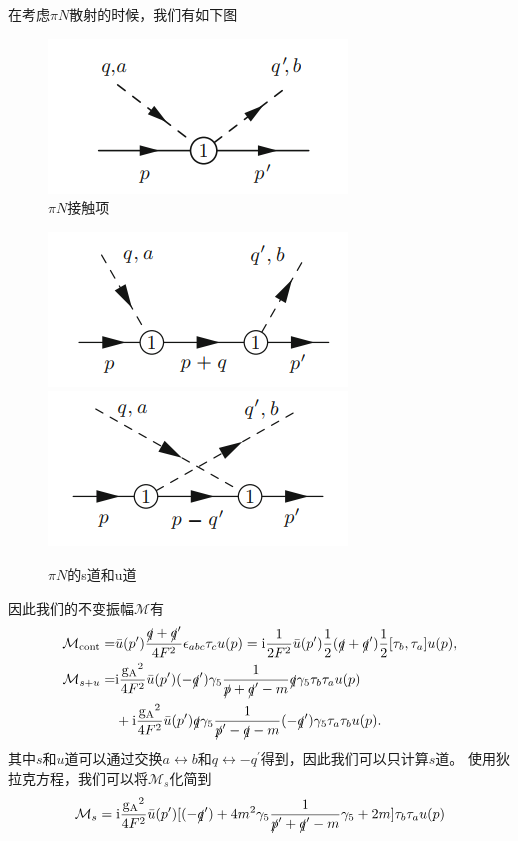 \documentclass[aps,tightenlines,16pt]{ctexart}
\numberwithin{equation}{section}
\begin{document}
在考虑$\pi N$散射的时候，我们有如下图
\begin{figure}[h]
   \centering
   \includegraphics{pin4.png}\caption{$\pi N$接触项}
\end{figure}
\begin{figure}[h]
   \centering
   \includegraphics{pin3s.png}
   \includegraphics{pin3u.png}\caption{$\pi N$的s道和u道}
\end{figure}
因此我们的不变振幅$\mathcal{M}$有
\begin{align}
   \begin{aligned}
   \mathcal{M}_{\text{cont}}=&\bar{u}(p^{\prime})\frac{\slashed{q}+\slashed{q}^{\prime}}{4F^2}\epsilon_{abc}\tau_c u(p) = \mbox{i}\frac{1}{2F^2}\bar{u}(p^{\prime})\frac{1}{2}(\slashed{q}+\slashed{q}^{\prime})\frac{1}{2}[\tau_b,\tau_a]u(p),\\
   \mathcal{M}_{s+u}=&\mbox{i}\frac{\mathrm{g_A}^2}{4F^2}\bar{u}(p^{\prime})(-\slashed{q}^{\prime})\gamma_5\frac{1}{\slashed{p}+\slashed{q}^{\prime}-m}\slashed{q}\gamma_5\tau_b\tau_a u(p)\\
   &+\mbox{i}\frac{\mathrm{g_A}^2}{4F^2}\bar{u}(p^{\prime})\slashed{q}\gamma_5\frac{1}{\slashed{p}^{\prime}-\slashed{q}-m}(-\slashed{q}^{\prime})\gamma_5\tau_a\tau_b u(p).
   \end{aligned}
\end{align}
其中$s$和$u$道可以通过交换$a\leftrightarrow b$和$q\leftrightarrow -q^{\prime}$得到，因此我们可以只计算$s$道。
使用狄拉克方程，我们可以将$\mathcal{M}_s$化简到
\begin{align}
   \mathcal{M}_s = \mbox{i}\frac{\mathrm{g_A}^2}{4F^2}\bar{u}(p^{\prime})[(-\slashed{q}^{\prime})+4m^2\gamma_5\frac{1}{\slashed{p}^{\prime}+\slashed{q}^{\prime}-m}\gamma_5+2m]\tau_b\tau_a u(p)
\end{align}



\newpage 

\renewcommand\refname{参考文献}




\end{document}
